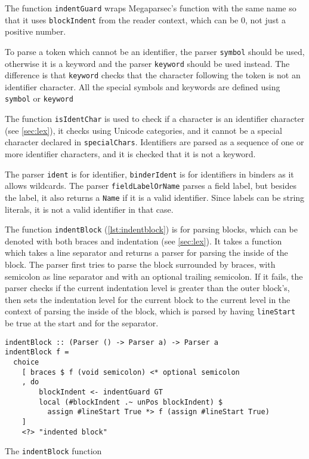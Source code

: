 The function \texttt{indentGuard} wraps Megaparsec's function with the
same name so that it uses \texttt{blockIndent} from the reader
context, which can be 0, not just a positive number.

To parse a token which cannot be an identifier, the parser
\texttt{symbol} should be used, otherwise it is a keyword and the parser
\texttt{keyword} should be used instead. The difference is that
\texttt{keyword} checks that the character following the token is not an
identifier character. All the special symbols and keywords are defined using
\texttt{symbol} or \texttt{keyword}

The function \texttt{isIdentChar} is used to check if a character is an
identifier character (see \cref{sec:lex}), it checks using Unicode categories,
and it cannot be a special character declared in \texttt{specialChars}.
Identifiers are parsed as a sequence of one or more identifier characters, and
it is checked that it is not a keyword.

The parser \texttt{ident} is for identifier,
\texttt{binderIdent} is for identifiers in binders as it allows
wildcards. The parser \texttt{fieldLabelOrName} parses a field label,
but besides the label, it also returns a \texttt{Name} if it is a valid
identifier. Since labels can be string literals, it is not a valid identifier in
that case.

The function \texttt{indentBlock} (\cref{lst:indentblock}) is for
parsing blocks, which can be denoted with both braces and indentation (see
\cref{sec:lex}). It takes a function which takes a line separator and returns a
parser for parsing the inside of the block. The parser first tries to parse the
block surrounded by braces, with semicolon as line separator and with an
optional trailing semicolon. If it fails, the parser checks if the current
indentation level is greater than the outer block's, then sets the indentation
level for the current block to the current level in the context of parsing the
inside of the block, which is parsed by having \texttt{lineStart} be
true at the start and for the separator.

\begin{listing}
  \begin{verbatim}
indentBlock :: (Parser () -> Parser a) -> Parser a
indentBlock f =
  choice
    [ braces $ f (void semicolon) <* optional semicolon
    , do
        blockIndent <- indentGuard GT
        local (#blockIndent .~ unPos blockIndent) $
          assign #lineStart True *> f (assign #lineStart True)
    ]
    <?> "indented block"
  \end{verbatim}
  \caption{The \texttt{indentBlock} function}\label{lst:indentblock}
\end{listing}

